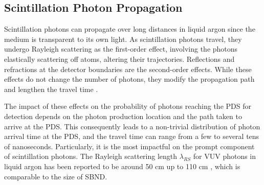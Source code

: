 
\subsection{Scintillation Photon Propagation}
\label{sec:photonprop}


Scintillation photons can propagate over long distances in liquid argon since the medium is transparent to its own light.
As scintillation photons travel, they undergo Rayleigh scattering as the first-order effect, involving the photons elastically scattering off atoms, altering their trajectories. 
Reflections and refractions at the detector boundaries are the second-order effects. 
While these effects do not change the number of photons, they modify the propagation path and lengthen the travel time \cite{sbnd_pds_paper}. 

The impact of these effects on the probability of photons reaching the PDS for detection depends on the photon production location and the path taken to arrive at the PDS. 
This consequently leads to a non-trivial distribution of photon arrival time at the PDS, and the travel time can range from a few to several tens of nanoseconds.
Particularly, it is the most impactful on the prompt component of scintillation photons.
The Rayleigh scattering length $\lambda_{RS}$ for VUV photons in liquid argon has been reported to be around 50 cm \cite{rayleigh50} up to 110 cm \cite{rayleigh110}, which is comparable to the size of SBND.


